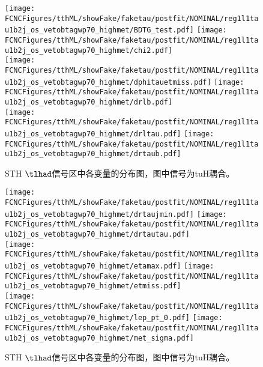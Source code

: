 \begin{figure}[H]
\centering
\texttt{[image: \\FCNCFigures/tthML/showFake/faketau/postfit/NOMINAL/reg1l1tau1b2j\_os\_vetobtagwp70\_highmet/BDTG\_test.pdf]}
\texttt{[image: \\FCNCFigures/tthML/showFake/faketau/postfit/NOMINAL/reg1l1tau1b2j\_os\_vetobtagwp70\_highmet/chi2.pdf]}
\\
\texttt{[image: \\FCNCFigures/tthML/showFake/faketau/postfit/NOMINAL/reg1l1tau1b2j\_os\_vetobtagwp70\_highmet/dphitauetmiss.pdf]}
\texttt{[image: \\FCNCFigures/tthML/showFake/faketau/postfit/NOMINAL/reg1l1tau1b2j\_os\_vetobtagwp70\_highmet/drlb.pdf]}
\\
\texttt{[image: \\FCNCFigures/tthML/showFake/faketau/postfit/NOMINAL/reg1l1tau1b2j\_os\_vetobtagwp70\_highmet/drltau.pdf]}
\texttt{[image: \\FCNCFigures/tthML/showFake/faketau/postfit/NOMINAL/reg1l1tau1b2j\_os\_vetobtagwp70\_highmet/drtaub.pdf]}
\\
\caption{STH $\tlhad$信号区中各变量的分布图，图中信号为tuH耦合。}
\label{fig:var_reg1l1tau1b2j_os_vetobtagwp70_highmet_0}
\end{figure}
\begin{figure}[H]
\centering
\texttt{[image: \\FCNCFigures/tthML/showFake/faketau/postfit/NOMINAL/reg1l1tau1b2j\_os\_vetobtagwp70\_highmet/drtaujmin.pdf]}
\texttt{[image: \\FCNCFigures/tthML/showFake/faketau/postfit/NOMINAL/reg1l1tau1b2j\_os\_vetobtagwp70\_highmet/drtautau.pdf]}
\\
\texttt{[image: \\FCNCFigures/tthML/showFake/faketau/postfit/NOMINAL/reg1l1tau1b2j\_os\_vetobtagwp70\_highmet/etamax.pdf]}
\texttt{[image: \\FCNCFigures/tthML/showFake/faketau/postfit/NOMINAL/reg1l1tau1b2j\_os\_vetobtagwp70\_highmet/etmiss.pdf]}
\\
\texttt{[image: \\FCNCFigures/tthML/showFake/faketau/postfit/NOMINAL/reg1l1tau1b2j\_os\_vetobtagwp70\_highmet/lep\_pt\_0.pdf]}
\texttt{[image: \\FCNCFigures/tthML/showFake/faketau/postfit/NOMINAL/reg1l1tau1b2j\_os\_vetobtagwp70\_highmet/met\_sigma.pdf]}
\\
\caption{STH $\tlhad$信号区中各变量的分布图，图中信号为tuH耦合。}
\label{fig:var_reg1l1tau1b2j_os_vetobtagwp70_highmet_1}
\end{figure}
